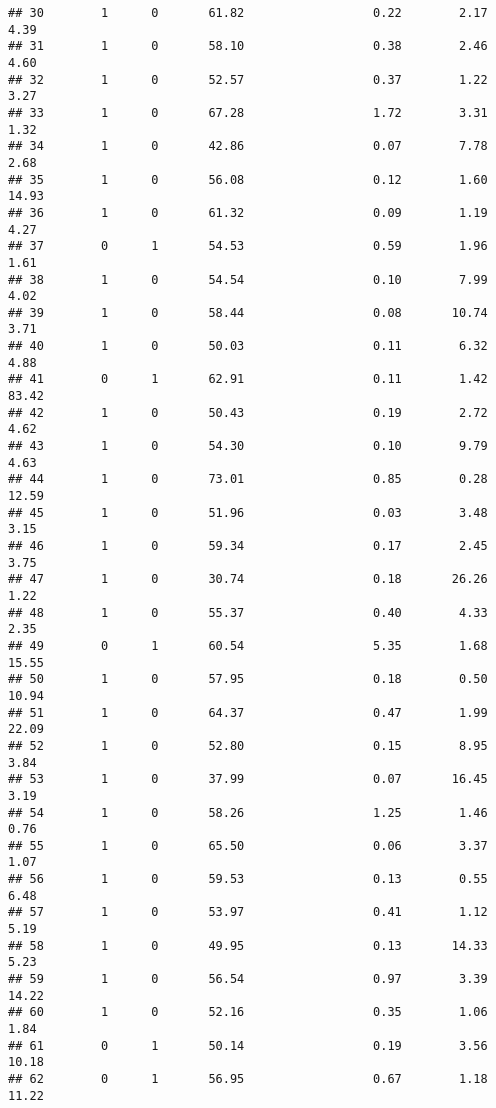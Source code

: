 \documentclass[
]{article}
\begin{document}
\begin{verbatim}
## 30        1      0       61.82                  0.22        2.17        4.39
## 31        1      0       58.10                  0.38        2.46        4.60
## 32        1      0       52.57                  0.37        1.22        3.27
## 33        1      0       67.28                  1.72        3.31        1.32
## 34        1      0       42.86                  0.07        7.78        2.68
## 35        1      0       56.08                  0.12        1.60       14.93
## 36        1      0       61.32                  0.09        1.19        4.27
## 37        0      1       54.53                  0.59        1.96        1.61
## 38        1      0       54.54                  0.10        7.99        4.02
## 39        1      0       58.44                  0.08       10.74        3.71
## 40        1      0       50.03                  0.11        6.32        4.88
## 41        0      1       62.91                  0.11        1.42       83.42
## 42        1      0       50.43                  0.19        2.72        4.62
## 43        1      0       54.30                  0.10        9.79        4.63
## 44        1      0       73.01                  0.85        0.28       12.59
## 45        1      0       51.96                  0.03        3.48        3.15
## 46        1      0       59.34                  0.17        2.45        3.75
## 47        1      0       30.74                  0.18       26.26        1.22
## 48        1      0       55.37                  0.40        4.33        2.35
## 49        0      1       60.54                  5.35        1.68       15.55
## 50        1      0       57.95                  0.18        0.50       10.94
## 51        1      0       64.37                  0.47        1.99       22.09
## 52        1      0       52.80                  0.15        8.95        3.84
## 53        1      0       37.99                  0.07       16.45        3.19
## 54        1      0       58.26                  1.25        1.46        0.76
## 55        1      0       65.50                  0.06        3.37        1.07
## 56        1      0       59.53                  0.13        0.55        6.48
## 57        1      0       53.97                  0.41        1.12        5.19
## 58        1      0       49.95                  0.13       14.33        5.23
## 59        1      0       56.54                  0.97        3.39       14.22
## 60        1      0       52.16                  0.35        1.06        1.84
## 61        0      1       50.14                  0.19        3.56       10.18
## 62        0      1       56.95                  0.67        1.18       11.22

\end{verbatim}
\end{document}
